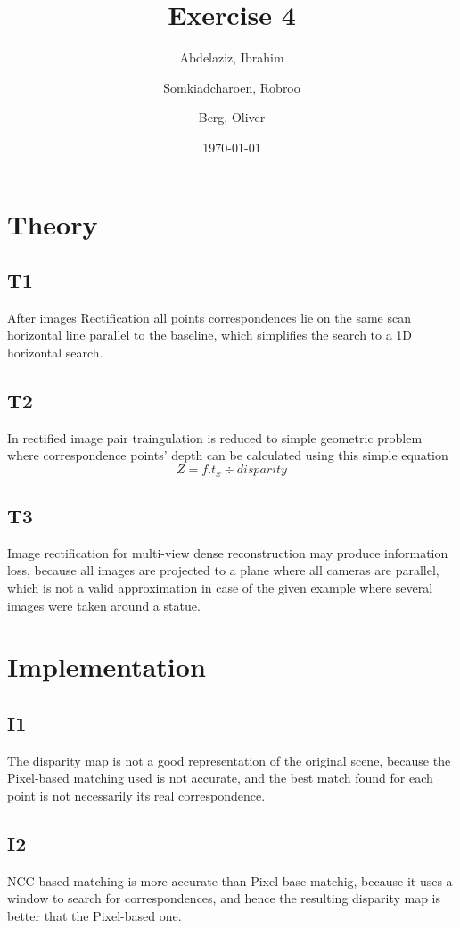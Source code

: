 \documentclass[a4paper, twoside, english]{article}
\title{Exercise 4}
\author{
	Abdelaziz, Ibrahim
	\and
	Somkiadcharoen, Robroo
	\and
	Berg, Oliver
}
\date{\today}
\begin{document}
\maketitle


\section{Theory}

\subsection{T1}
After images Rectification all points correspondences lie on the same scan horizontal line parallel to the baseline, which simplifies the search to a 1D horizontal search.

\subsection{T2}
In rectified image pair traingulation is reduced to simple geometric problem where correspondence points' depth can be calculated using this simple equation \begin{equation} Z = f.t_{x} \div disparity \end{equation}
\subsection{T3}
Image rectification for multi-view dense reconstruction may produce information loss, because all images are projected to a plane where all cameras are parallel, which is not a valid approximation in case of the given example where several images were taken around a statue.  

\section{Implementation}
\subsection{I1}
The disparity map is not a good representation of the original scene, because the Pixel-based matching used is not accurate, and the best match found for each point is not necessarily its real correspondence. 
\subsection{I2}
NCC-based matching is more accurate than Pixel-base matchig, because it uses a window to search for correspondences, and hence the resulting disparity map is better that the Pixel-based one.
\end{document}
